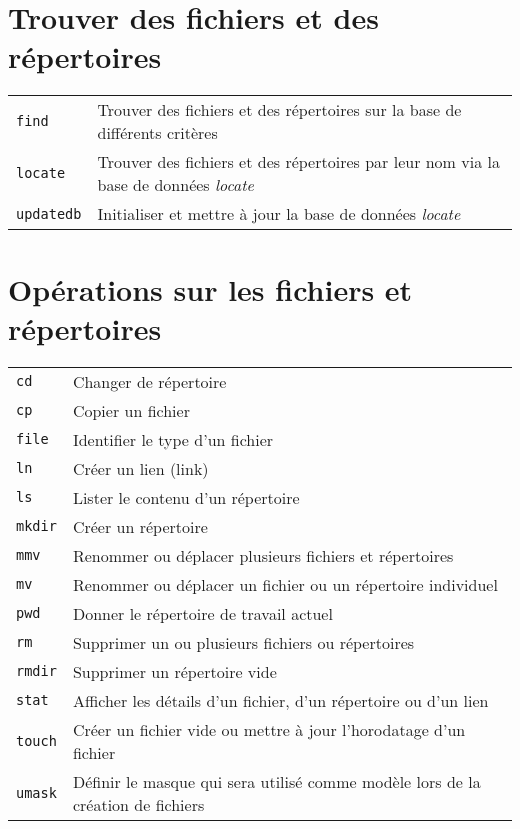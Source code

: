 \documentclass[10pt,a4paper]{article}
\begin{document}
\begin{multicols}{2}
\vfill

\section{Trouver des fichiers et des répertoires}
\begin{tabular}{ p{2.5cm} p{8.5cm} }
  \hline
  \texttt{find} & Trouver des fichiers et des répertoires sur la base de différents critères \\
  \texttt{locate} &  Trouver des fichiers et des répertoires par leur nom via la base de données \textit{locate}\\
  \texttt{updatedb} & Initialiser et mettre à jour la base de données \textit{locate}\\
  \hline
\end{tabular}

\columnbreak

\section{Opérations sur les fichiers et répertoires}
\begin{tabular}{ p{2.5cm} p{8.5cm} }
  \hline
  \texttt{cd} & Changer de répertoire \\
  \texttt{cp} & Copier un fichier \\
  \texttt{file} & Identifier le type d'un fichier\\
  \texttt{ln} & Créer un lien (link)\\
  \texttt{ls} & Lister le contenu d'un répertoire\\
  \texttt{mkdir} & Créer un répertoire\\
  \texttt{mmv} & Renommer ou déplacer plusieurs fichiers et répertoires \\
  \texttt{mv} & Renommer ou déplacer un fichier ou un répertoire individuel \\
  \texttt{pwd} & Donner le répertoire de travail actuel \\
  \texttt{rm} & Supprimer un ou plusieurs fichiers ou répertoires \\
  \texttt{rmdir} & Supprimer un répertoire vide \\
  \texttt{stat} & Afficher les détails d'un fichier, d'un répertoire ou d'un lien \\
  \texttt{touch} & Créer un fichier vide ou mettre à jour l'horodatage d'un fichier \\
  \texttt{umask} & Définir le masque qui sera utilisé comme modèle lors de la création de fichiers\\
  \hline
\end{tabular}


\end{multicols}
\end{document}
